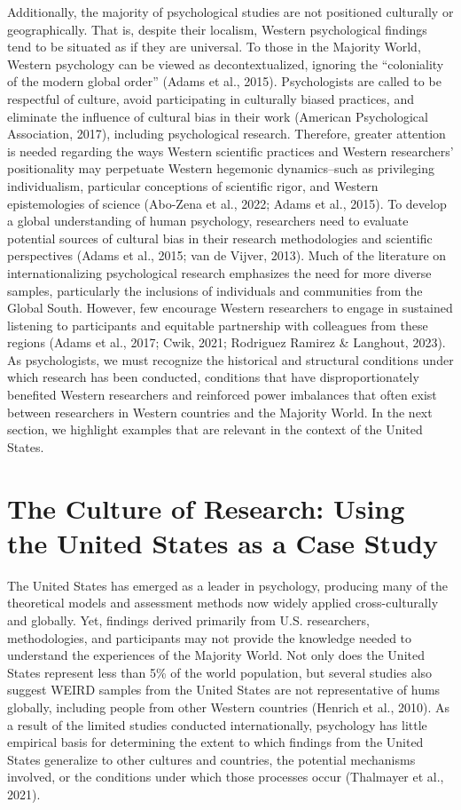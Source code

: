 \documentclass[
  11pt,
]{book}
\begin{document}
Additionally, the majority of psychological studies are not positioned culturally or geographically. That is, despite their localism, Western psychological findings tend to be situated as if they are universal. To those in the Majority World, Western psychology can be viewed as decontextualized, ignoring the ``coloniality of the modern global order'' (Adams et al., 2015). Psychologists are called to be respectful of culture, avoid participating in culturally biased practices, and eliminate the influence of cultural bias in their work (American Psychological Association, 2017), including psychological research. Therefore, greater attention is needed regarding the ways Western scientific practices and Western researchers' positionality may perpetuate Western hegemonic dynamics--such as privileging individualism, particular conceptions of scientific rigor, and Western epistemologies of science (Abo-Zena et al., 2022; Adams et al., 2015). To develop a global understanding of human psychology, researchers need to evaluate potential sources of cultural bias in their research methodologies and scientific perspectives (Adams et al., 2015; van de Vijver, 2013). Much of the literature on internationalizing psychological research emphasizes the need for more diverse samples, particularly the inclusions of individuals and communities from the Global South. However, few encourage Western researchers to engage in sustained listening to participants and equitable partnership with colleagues from these regions (Adams et al., 2017; Cwik, 2021; Rodriguez Ramirez \& Langhout, 2023). As psychologists, we must recognize the historical and structural conditions under which research has been conducted, conditions that have disproportionately benefited Western researchers and reinforced power imbalances that often exist between researchers in Western countries and the Majority World. In the next section, we highlight examples that are relevant in the context of the United States.

\section{The Culture of Research: Using the United States as a Case Study}\label{the-culture-of-research-using-the-united-states-as-a-case-study}

The United States has emerged as a leader in psychology, producing many of the theoretical models and assessment methods now widely applied cross-culturally and globally. Yet, findings derived primarily from U.S. researchers, methodologies, and participants may not provide the knowledge needed to understand the experiences of the Majority World. Not only does the United States represent less than 5\% of the world population, but several studies also suggest WEIRD samples from the United States are not representative of hums globally, including people from other Western countries (Henrich et al., 2010). As a result of the limited studies conducted internationally, psychology has little empirical basis for determining the extent to which findings from the United States generalize to other cultures and countries, the potential mechanisms involved, or the conditions under which those processes occur (Thalmayer et al., 2021).
\end{document}
